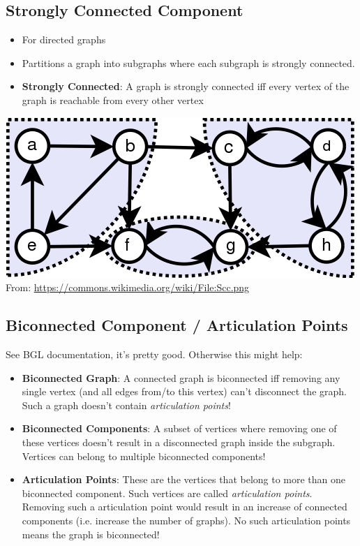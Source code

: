 \documentclass[a4paper,titlepage]{article}
\begin{document}
\subsection{Strongly Connected Component}
\begin{itemize}
\item For directed graphs
\item Partitions a graph into subgraphs where each subgraph is strongly connected.
\item \textbf{Strongly Connected}: A graph is strongly connected iff every vertex of the graph is reachable from every other vertex
\end{itemize}

\includegraphics[scale=0.4]{_useful-snippets/graph0.png}\\
From: \url{https://commons.wikimedia.org/wiki/File:Scc.png}

\subsection{Biconnected Component / Articulation Points}
See BGL documentation, it's pretty good. Otherwise this might help:
\begin{itemize}
\item \textbf{Biconnected Graph}: A connected graph is biconnected iff removing any single vertex (and all edges from/to this vertex) can't disconnect the graph. Such a graph doesn't contain \textit{articulation points}!
\item \textbf{Biconnected Components}: A subset of vertices where removing one of these vertices doesn't result in a disconnected graph inside the subgraph. Vertices can belong to multiple biconnected components!
\item \textbf{Articulation Points}: These are the vertices that belong to more than one biconnected component. Such vertices are called \textit{articulation points}. Removing such a articulation point would result in an increase of connected components (i.e. increase the number of graphs). No such articulation points means the graph is biconnected!
\end{itemize}
\end{document}
